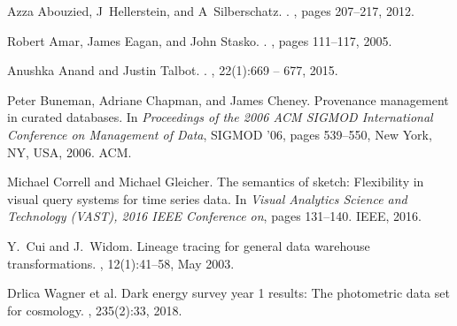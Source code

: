 \documentclass[11pt]{article}
\begin{document}
{\footnotesize 
\begin{thebibliography}{}

Azza Abouzied, J~Hellerstein, and A~Silberschatz.
.
, pages 207--217, 2012.

Robert Amar, James Eagan, and John Stasko.
.
, pages 111--117, 2005.

Anushka Anand and Justin Talbot.
.
,
  22(1):669 -- 677, 2015.

Peter Buneman, Adriane Chapman, and James Cheney.
\newblock Provenance management in curated databases.
\newblock In {\em Proceedings of the 2006 ACM SIGMOD International Conference
  on Management of Data}, SIGMOD '06, pages 539--550, New York, NY, USA, 2006.
  ACM.

Michael Correll and Michael Gleicher.
\newblock The semantics of sketch: Flexibility in visual query systems for time
  series data.
\newblock In {\em Visual Analytics Science and Technology (VAST), 2016 IEEE
  Conference on}, pages 131--140. IEEE, 2016.

Y.~Cui and J.~Widom.
\newblock Lineage tracing for general data warehouse transformations.
, 12(1):41--58, May 2003.

{Drlica Wagner et al.}
\newblock Dark energy survey year 1 results: The photometric data set for
  cosmology.
, 235(2):33, 2018.


\end{thebibliography}}
\end{document}
